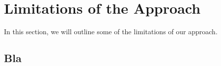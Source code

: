 \section{Limitations of the Approach}

In this section, we will outline some of the limitations of our approach.

\subsection{Bla}